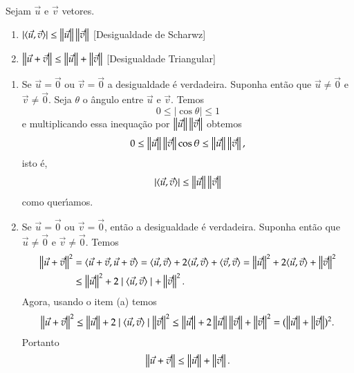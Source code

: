 \begin{proposicao}\label{DesigualdadeTriangular}
  Sejam $\vec{u}$ e $\vec{v}$ vetores.
  \begin{enumerate}
    \item $|\langle \vec{u}, \vec{v} \rangle| \le \left\Vert{\vec{u}}\right\Vert\left\Vert{\vec{v}}\right\Vert$ [Desigualdade de Scharwz]
    \item $\left\Vert{\vec{u} + \vec{v}}\right\Vert \le \left\Vert{\vec{u}}\right\Vert + \left\Vert{\vec{v}}\right\Vert$ [Desigualdade Triangular]
  \end{enumerate}
\end{proposicao}
\begin{prova}
  \begin{enumerate}
    \item Se $\vec{u} = \vec{0}$ ou $\vec{v} = \vec{0}$ a desigualdade \'e verdadeira. Suponha ent\~ao que $\vec{u} \ne \vec{0}$ e $\vec{v} \ne \vec{0}$. Seja $\theta$ o \^angulo entre $\vec{u}$ e $\vec{v}$. Temos
    \[
      0 \le |\cos\theta| \le 1
    \]
    e multiplicando essa inequa\c{c}\~ao por $\left\Vert{\vec{u}}\right\Vert\left\Vert{\vec{v}}\right\Vert$ obtemos
    \[
      0 \le \left\Vert{\vec{u}}\right\Vert\left\Vert{\vec{v}}\right\Vert\cos\theta \le \left\Vert{\vec{u}}\right\Vert\left\Vert{\vec{v}}\right\Vert,
    \]
    isto \'e,
    \[
      |\langle \vec{u}, \vec{v} \rangle| \le \left\Vert{\vec{u}}\right\Vert\left\Vert{\vec{v}}\right\Vert
    \]
    como quer{\'\i}amos.
    \item Se $\vec{u} = \vec{0}$ ou $\vec{v} = \vec{0}$, ent\~ao a desigualdade \'e verdadeira. Suponha ent\~ao que $\vec{u} \ne \vec{0}$ e $\vec{v} \ne \vec{0}$. Temos
    \begin{align*}
      \left\Vert{\vec{u} + \vec{v}}\right\Vert^2 &= \langle\vec{u} + \vec{v}, \vec{u} + \vec{v}\rangle = \langle \vec{u}, \vec{v} \rangle + 2\langle \vec{u}, \vec{v} \rangle + \langle \vec{v}, \vec{v} \rangle = \left\Vert{\vec{u}}\right\Vert^2 + 2\langle \vec{u}, \vec{v} \rangle + \left\Vert{\vec{v}}\right\Vert^2 \\ &\le \left\Vert{\vec{u}}\right\Vert^2 + 2\mid\langle \vec{u}, \vec{v} \rangle\mid + \left\Vert{\vec{v}}\right\Vert^2.
    \end{align*}
    Agora, usando o item (a) temos
    \begin{align*}
      \left\Vert{\vec{u} + \vec{v}}\right\Vert^2 \le \left\Vert{\vec{u}}\right\Vert + 2\mid\langle \vec{u}, \vec{v} \rangle\mid \left\Vert{\vec{v}}\right\Vert^2 \le \left\Vert{\vec{u}}\right\Vert + 2\left\Vert{\vec{u}}\right\Vert\left\Vert{\vec{v}}\right\Vert + \left\Vert{\vec{v}}\right\Vert^2 = (\left\Vert{\vec{u}}\right\Vert + \left\Vert{\vec{v}}\right\Vert)^2.
    \end{align*}
    Portanto
    \[
      \left\Vert{\vec{u} + \vec{v}}\right\Vert \le \left\Vert{\vec{u}}\right\Vert + \left\Vert{\vec{v}}\right\Vert.
    \]
  \end{enumerate}
\end{prova}

